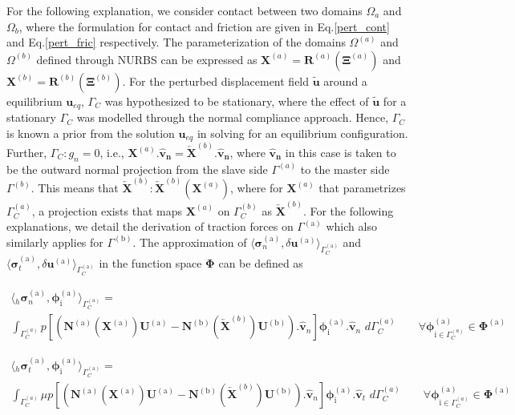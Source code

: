 For the following explanation, we consider contact between two domains $\Omega_a$ and $\Omega_b$, where the formulation for contact and friction are given in Eq.\eqref{pert_cont} and Eq.\eqref{pert_fric} respectively.
The parameterization of the domains $\Omega^{(a)}$ and  $\Omega^{(b)}$ defined through NURBS can be expressed as $\bm X^{(a)} =\mathbf{R}^{(a)}(\bm \Xi^{(a)})$ and $\bm X^{(b)} =\mathbf{R}^{(b)}(\bm \Xi^{(b)})$.
For the perturbed displacement field $\bm{\widetilde{u}}$ around a equilibrium $\bm u_{eq}$, $\Gamma_C$ was hypothesized to be stationary, where the effect of $\bm{\widetilde{u}}$ for a stationary $\Gamma_C$ was modelled through the normal compliance approach. Hence, $\Gamma_C$ is known a prior from the solution $\bm u_{eq}$ in solving for an equilibrium configuration. Further, $\Gamma_C: g_n = 0$, i.e., $\bm X^{(a)}.\bm{\hat{v}_n}={\overleftarrow{\bm X}^{(b)}}.\bm{\hat{v}_n}$, where $\bm{\hat{v}_n}$ in this case is taken to be the outward normal projection from the slave side $\Gamma^{(a)}$ to the master side $\Gamma^{(b)}$. This means that ${\overleftarrow{\bm X}^{(b)}}: {\overleftarrow{\bm X}^{(b)}}(\bm X^{(a)})$, where for $\bm X^{(a)}$ that parametrizes $\Gamma_C^{(a)}$, a projection exists that maps $\bm X^{(a)}$ on $\Gamma_C^{(b)}$ as ${\overleftarrow{\bm X}^{(b)}}$. 
For the following explanations, we detail the derivation of traction forces on $\Gamma^{\mathrm{(a)}}$ which also similarly applies for $\Gamma^{\mathrm{(b)}}$. 
The approximation of ${\langle \bm{\sigma}^{\mathrm{(a)}}_n, \delta \bm u^{\mathrm{(a)}} \rangle_{\Gamma_C^{\mathrm{(a)}}}}$ and $ {\langle \bm{\sigma}^{\mathrm{(a)}}_t, \delta \bm u^{\mathrm{(a)}} \rangle_{\Gamma_C^{\mathrm{(a)}}}} $ in the function space $\bm \Phi$ can be defined as

\begin{multline}
{\langle {}_h\bm{\sigma}^{\mathrm{(a)}}_n,  \bm \phi^{\mathrm{(a)}}_{\mathrm{i}} \rangle_{\Gamma_C^{\mathrm{(a)}}}} =\\
\int_{\Gamma^{(a)}_C} p[(\bm N^{\mathrm{(a)}}(\bm X^{\mathrm{(a)}})\bm U^{\mathrm{(a)}} - \bm N^{\mathrm{(b)}}(\overleftarrow{\bm X}^{(b)})\bm U^{\mathrm{(b)}}).\bm{\hat{v}}_n] \bm \phi^{\mathrm{(a)}}_{\mathrm{i}} . \bm{\hat{v}}_n \,\, d\Gamma^{(a)}_C  \qquad \forall \bm \phi^{\mathrm{(a)}}_{\mathrm{i}\in \Gamma_C^{(a)}} \in \bm\Phi^{\mathrm{(a)}}  
\end{multline}

\begin{multline}
{\langle {}_h\bm{\sigma}^{\mathrm{(a)}}_t,  \bm \phi^{\mathrm{(a)}}_{\mathrm{i}} \rangle_{\Gamma_C^{\mathrm{(a)}}}} =\\
\int_{\Gamma^{(a)}_C} \mu p[(\bm N^{\mathrm{(a)}}(\bm X^{\mathrm{(a)}})\bm U^{\mathrm{(a)}} - \bm N^{\mathrm{(b)}}(\overleftarrow{\bm X}^{(b)})\bm U^{\mathrm{(b)}}).\bm{\hat{v}}_n] \bm \phi^{\mathrm{(a)}}_{\mathrm{i}} . \bm{\hat{v}}_t \,\, d\Gamma^{(a)}_C \qquad \forall \bm \phi^{\mathrm{(a)}}_{\mathrm{i}\in \Gamma_C^{(a)}} \in \bm\Phi^{\mathrm{(a)}}  
\end{multline}

